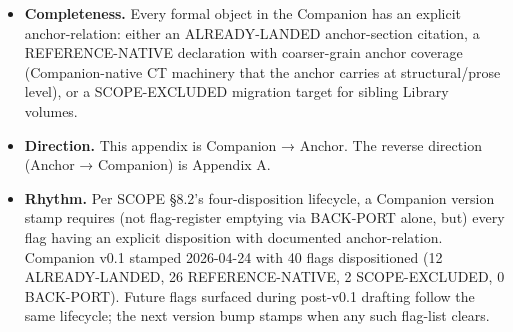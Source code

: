 \documentclass[11pt, openany]{book}
\newcommand{\sectionbreak}{\clearpage}
\begin{document}
\begin{itemize}
\item \textbf{Completeness.} Every formal object in the Companion has an explicit anchor-relation: either an ALREADY-LANDED anchor-section citation, a REFERENCE-NATIVE declaration with coarser-grain anchor coverage (Companion-native CT machinery that the anchor carries at structural/prose level), or a SCOPE-EXCLUDED migration target for sibling Library volumes.
\item \textbf{Direction.} This appendix is Companion → Anchor. The reverse direction (Anchor → Companion) is Appendix A.
\item \textbf{Rhythm.} Per SCOPE §8.2's four-disposition lifecycle, a Companion version stamp requires (not flag-register emptying via BACK-PORT alone, but) every flag having an explicit disposition with documented anchor-relation. Companion v0.1 stamped 2026-04-24 with 40 flags dispositioned (12 ALREADY-LANDED, 26 REFERENCE-NATIVE, 2 SCOPE-EXCLUDED, 0 BACK-PORT). Future flags surfaced during post-v0.1 drafting follow the same lifecycle; the next version bump stamps when any such flag-list clears.
\end{itemize}

\sectionbreak
\end{document}
